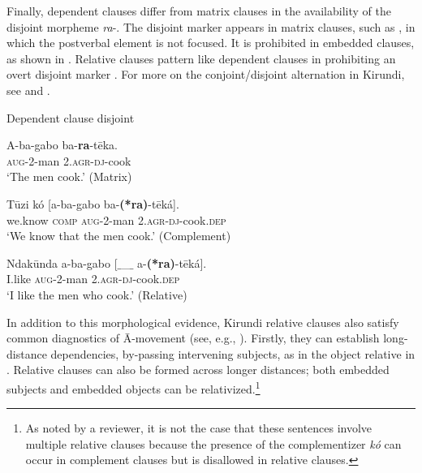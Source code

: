 \documentclass[output=paper,colorlinks,citecolor=brown
]{langscibook}
\begin{document}
Finally, dependent clauses differ from matrix clauses in the availability of the disjoint morpheme \emph{ra}-. The disjoint marker appears in matrix clauses, such as 
, in which the postverbal element is not focused. It is prohibited in embedded clauses, as shown in . Relative clauses pattern like dependent clauses in prohibiting an overt disjoint marker . For more on the conjoint/disjoint alternation in Kirundi, see \citet{Ndayiragije:1999} and \citet{NshemezimanaBostoen:2017}.


\ea Dependent clause disjoint
\begin{xlist}
\ex \label{ex:myers:dis1}		\gll	A-ba-gabo ba-{\bfseries  ra}-tēka. \label{ex:con}\\
			\textsc{aug}-2-man \textsc{2.agr-dj}-cook\\
			\glt `The men cook.'  \hfill{(Matrix)}
			
\ex \label{ex:myers:dis2}		\label{ex:dis}			\gll Tūzi kó [a-ba-gabo ba-{\bfseries  (*ra)}-tēká].\\
we.know \textsc{comp} \textsc{aug}-2-man \textsc{2.agr}-\textsc{dj}-cook\textsc{.dep}\\
\glt `We know that the men cook.' \hfill{(Complement)}

\ex \label{ex:myers:dis3}		\gll	Ndakūnda  a-ba-gabo [{$\_$\_$\_$} a-{\bfseries  (*ra)}-tēká]. \\
		I.like \textsc{aug}-2-man {} \textsc{2.agr}-\textsc{dj}-cook\textsc{.dep} \\
		\glt `I like the men who cook.' \hfill{(Relative)} 
\end{xlist}
\z


In addition to this morphological evidence, Kirundi relative clauses also satisfy common diagnostics of Ā-movement (see, e.g., \citealt{Safir:2019}). Firstly, they can establish long-distance dependencies, by-passing intervening subjects, as in the object relative in . Relative clauses can also be formed across longer distances; both embedded subjects  and embedded objects  can be relativized.\footnote{As noted by a reviewer, it is not the case that these sentences involve multiple relative clauses because the presence of the complementizer \emph{kó} can occur in  complement clauses but is disallowed in relative clauses.}
\end{document}
